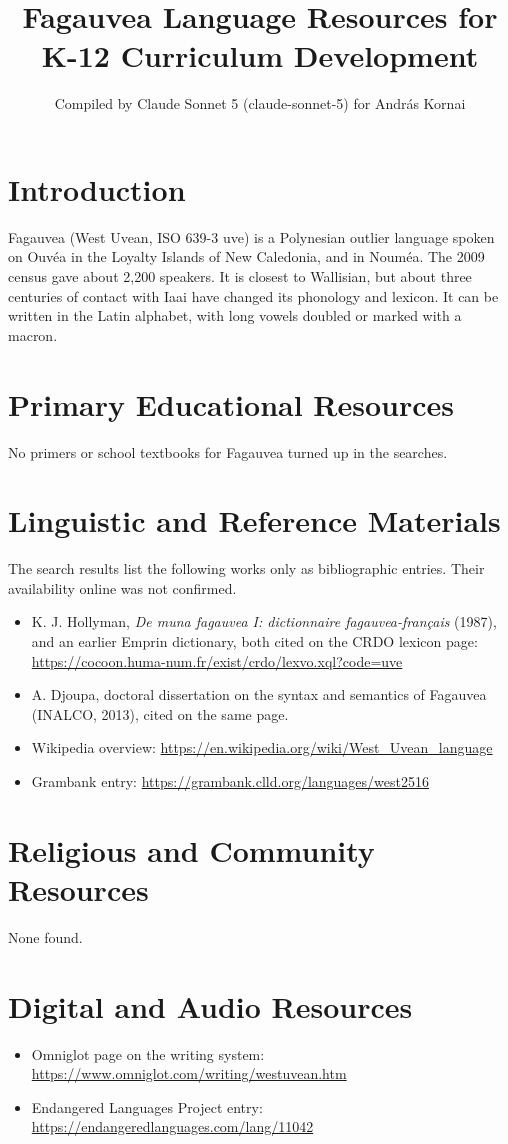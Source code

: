 \documentclass[12pt]{article}
\title{Fagauvea Language Resources for K-12 Curriculum Development}
\author{Compiled by Claude Sonnet 5 (claude-sonnet-5) for Andr\'as Kornai}
\date{}
\begin{document}
\maketitle

\section{Introduction}
Fagauvea (West Uvean, ISO 639-3 uve) is a Polynesian outlier language spoken on Ouv\'ea in the Loyalty Islands of New Caledonia, and in Noum\'ea. The 2009 census gave about 2,200 speakers. It is closest to Wallisian, but about three centuries of contact with Iaai have changed its phonology and lexicon. It can be written in the Latin alphabet, with long vowels doubled or marked with a macron.

\section{Primary Educational Resources}
No primers or school textbooks for Fagauvea turned up in the searches.

\section{Linguistic and Reference Materials}
The search results list the following works only as bibliographic entries. Their availability online was not confirmed.
\begin{itemize}
\item K. J. Hollyman, \emph{De muna fagauvea I: dictionnaire fagauvea-fran\c{c}ais} (1987), and an earlier Emprin dictionary, both cited on the CRDO lexicon page: \url{https://cocoon.huma-num.fr/exist/crdo/lexvo.xql?code=uve}
\item A. Djoupa, doctoral dissertation on the syntax and semantics of Fagauvea (INALCO, 2013), cited on the same page.
\item Wikipedia overview: \url{https://en.wikipedia.org/wiki/West_Uvean_language}
\item Grambank entry: \url{https://grambank.clld.org/languages/west2516}
\end{itemize}

\section{Religious and Community Resources}
None found.

\section{Digital and Audio Resources}
\begin{itemize}
\item Omniglot page on the writing system: \url{https://www.omniglot.com/writing/westuvean.htm}
\item Endangered Languages Project entry: \url{https://endangeredlanguages.com/lang/11042}
\end{itemize}
\end{document}
